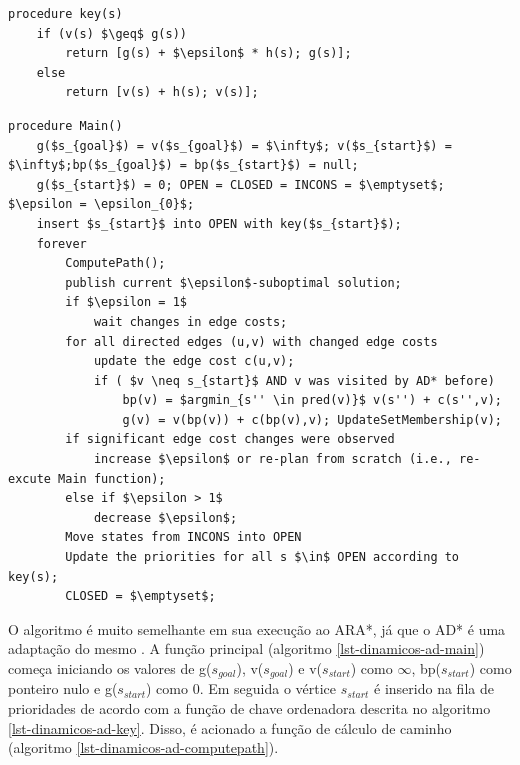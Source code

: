 \begin{lstlisting}[mathescape, label=lst-dinamicos-ad-key, caption=Algoritmo AD* - função da chave ordenadora da fila de prioridades, float=htpb]
procedure key(s)
	if (v(s) $\geq$ g(s))
		return [g(s) + $\epsilon$ * h(s); g(s)];
	else
		return [v(s) + h(s); v(s)];
\end{lstlisting}

\begin{lstlisting}[mathescape, label=lst-dinamicos-ad-main, caption=Algoritmo AD* - função principal, float=htpb]
procedure Main()
	g($s_{goal}$) = v($s_{goal}$) = $\infty$; v($s_{start}$) = $\infty$;bp($s_{goal}$) = bp($s_{start}$) = null;
	g($s_{start}$) = 0; OPEN = CLOSED = INCONS = $\emptyset$; $\epsilon = \epsilon_{0}$;
	insert $s_{start}$ into OPEN with key($s_{start}$);
	forever
		ComputePath();
		publish current $\epsilon$-suboptimal solution;
		if $\epsilon = 1$
			wait changes in edge costs;
		for all directed edges (u,v) with changed edge costs
			update the edge cost c(u,v);
			if ( $v \neq s_{start}$ AND v was visited by AD* before)
				bp(v) = $argmin_{s'' \in pred(v)}$ v(s'') + c(s'',v);
				g(v) = v(bp(v)) + c(bp(v),v); UpdateSetMembership(v);
		if significant edge cost changes were observed
			increase $\epsilon$ or re-plan from scratch (i.e., re-excute Main function);
		else if $\epsilon > 1$
			decrease $\epsilon$;
		Move states from INCONS into OPEN
		Update the priorities for all s $\in$ OPEN according to key(s);
		CLOSED = $\emptyset$;
\end{lstlisting}

O algoritmo é muito semelhante em sua execução ao ARA*, já que o AD* é uma adaptação do mesmo \cite{moura2010estudo}. A função principal (algoritmo \ref{lst-dinamicos-ad-main}) começa iniciando os valores de g($s_{goal}$), v($s_{goal}$) e v($s_{start}$) como $\infty$, bp($s_{start}$) como ponteiro nulo e g($s_{start}$) como 0. Em seguida o vértice $s_{start}$ é inserido na fila de prioridades de acordo com  a função de chave ordenadora descrita no algoritmo \ref{lst-dinamicos-ad-key}. Disso, é acionado a função de cálculo de caminho (algoritmo \ref{lst-dinamicos-ad-computepath}).

